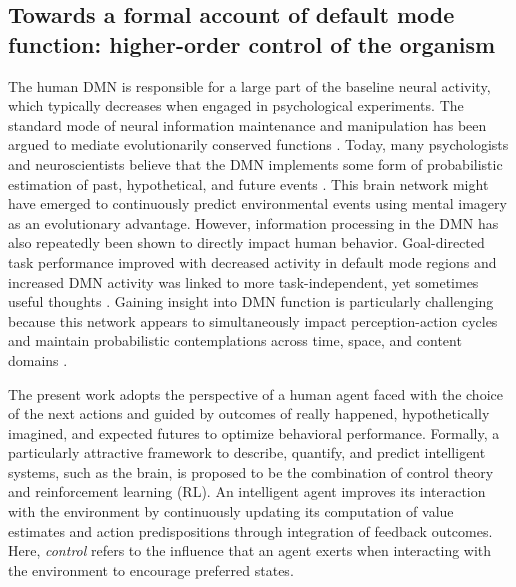 \documentclass[10pt,letterpaper]{article}
\begin{document}
\subsection{Towards a formal account of default mode function: higher-order control of the organism}
The human DMN is responsible for a large part of the baseline neural activity,
which typically decreases when engaged in psychological experiments.
The standard mode of
neural information maintenance and manipulation has
been argued to mediate evolutionarily conserved functions
\citep{brown1914nature, binder1999conceptual, buzsaki2006rhythms}.
Today, many psychologists and neuroscientists believe that
the DMN implements some form of
probabilistic estimation of past, hypothetical, and
future events
\citep{fox2005, hassabis2007patients, schacter2007remembering, binder2009,
randy2008, spreng2009common}.
This brain network
might have emerged to continuously predict environmental events using
mental imagery as an evolutionary advantage.
%
However, information processing in the DMN has also repeatedly
been shown to directly impact human behavior. Goal-directed task performance
improved with decreased activity in default mode regions \citep{weiss2006}
and increased DMN activity was linked to more task-independent,
yet sometimes useful thoughts
\citep{mason2007, seli2016mind}.
%
Gaining insight into DMN function is
particularly challenging because
this network appears to
simultaneously impact perception-action cycles and
maintain probabilistic contemplations
across time, space, and content domains
\citep{boyer2008evolutionary}.


The present work adopts the perspective of
a human agent faced with the choice of the next actions
and guided by outcomes
of really happened, hypothetically imagined, and
expected futures to optimize behavioral performance.
Formally, a particularly attractive framework
to describe, quantify, and predict intelligent systems, such as the brain,
is proposed to be the combination of control theory and
reinforcement learning (RL).
An intelligent agent improves its interaction with the environment
by continuously updating its computation of value estimates and action predispositions
through integration of feedback outcomes.
Here,
\textit{control} refers to the influence that an agent exerts when interacting
with the environment to encourage preferred states.
\end{document}
